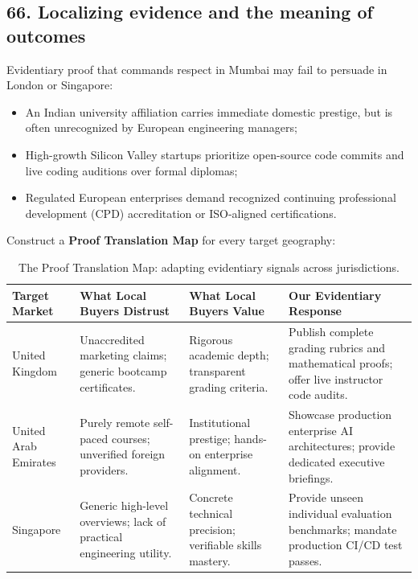 \subsection{66. Localizing evidence and the meaning of outcomes}

Evidentiary proof that commands respect in Mumbai may fail to persuade in London or Singapore:
\begin{itemize}
    \item An Indian university affiliation carries immediate domestic prestige, but is often unrecognized by European engineering managers;
    \item High-growth Silicon Valley startups prioritize open-source code commits and live coding auditions over formal diplomas;
    \item Regulated European enterprises demand recognized continuing professional development (CPD) accreditation or ISO-aligned certifications.
\end{itemize}

Construct a \textbf{Proof Translation Map} for every target geography:

\begin{table}[t]
\centering
\small
\caption{The Proof Translation Map: adapting evidentiary signals across jurisdictions.}
\label{tab:proof_translation}
\begin{tabularx}{\textwidth}{p{2.8cm} p{3.6cm} p{3.4cm} X}
\toprule
\textbf{Target Market} & \textbf{What Local Buyers Distrust} & \textbf{What Local Buyers Value} & \textbf{Our Evidentiary Response} \\
\midrule
United Kingdom & Unaccredited marketing claims; generic bootcamp certificates. & Rigorous academic depth; transparent grading criteria. & Publish complete grading rubrics and mathematical proofs; offer live instructor code audits. \\
United Arab Emirates & Purely remote self-paced courses; unverified foreign providers. & Institutional prestige; hands-on enterprise alignment. & Showcase production enterprise AI architectures; provide dedicated executive briefings. \\
Singapore & Generic high-level overviews; lack of practical engineering utility. & Concrete technical precision; verifiable skills mastery. & Provide unseen individual evaluation benchmarks; mandate production CI/CD test passes. \\
\bottomrule
\end{tabularx}
\end{table}

